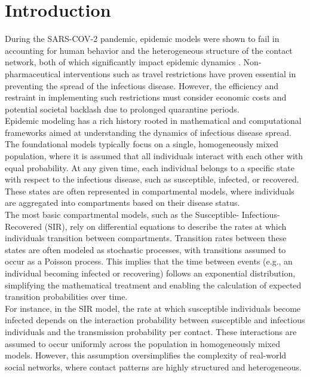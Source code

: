 % 

\section{Introduction}

During the SARS-COV-2 pandemic, epidemic models were shown to fail in accounting for human behavior and the heterogeneous structure of the contact network, both of which significantly impact epidemic dynamics \cite{Lewis2021wrong}. Non-pharmaceutical interventions such as travel restrictions have proven essential in preventing the spread of the infectious disease. However, the efficiency and restraint in implementing such restrictions must consider economic costs and potential societal backlash due to prolonged quarantine periods.\\ 

Epidemic modeling has a rich history rooted in mathematical and computational frameworks aimed at understanding the dynamics of infectious disease spread. The foundational models typically focus on a single, homogeneously mixed population, where it is assumed that all individuals interact with each other with equal probability. At any given time, each individual belongs to a specific state with respect to the infectious disease, such as susceptible, infected, or recovered. These states are often represented in compartmental models, where individuals are aggregated into compartments based on their disease status.\\

The most basic compartmental models, such as the Susceptible- Infectious- Recovered (SIR), rely on differential equations to describe the rates at which individuals transition between compartments. Transition rates between these states are often modeled as stochastic processes, with transitions assumed to occur as a Poisson process. This implies that the time between events (e.g., an individual becoming infected or recovering) follows an exponential distribution, simplifying the mathematical treatment and enabling the calculation of expected transition probabilities over time.\\

For instance, in the SIR model, the rate at which susceptible individuals become infected depends on the interaction probability between susceptible and infectious individuals and the transmission probability per contact. These interactions are assumed to occur uniformly across the population in homogeneously mixed models. However, this assumption oversimplifies the complexity of real-world social networks, where contact patterns are highly structured and heterogeneous.\\

